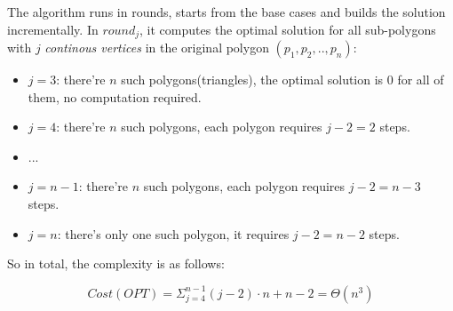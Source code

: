 The algorithm runs in rounds, starts from the base cases and builds the solution incrementally. In $round_j$, it computes the optimal solution for all sub-polygons with $j$ \textit{continous vertices} in the original polygon $(p_1, p_2, .., p_n)$:

\begin{itemize}
\item {$j = 3$}: there're $n$ such polygons(triangles), the optimal solution is 0 for all of them, no computation required.
\item {$j = 4$}: there're $n$ such polygons, each polygon requires $j - 2 = 2$ steps.
\item ...
\item {$j = n-1$}: there're $n$ such polygons, each polygon requires $j - 2 = n-3$ steps.
\item {$j = n$}: there's only one such polygon, it requires $j - 2 = n-2$ steps.
\end{itemize}

So in total, the complexity is as follows:

\[
  Cost(OPT) = \Sigma_{j=4}^{n-1}(j-2) \cdot n + n - 2 = \Theta(n^3)
\]
